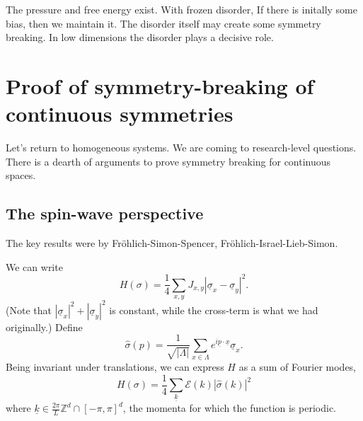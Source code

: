 \documentclass[12pt]{book}
\theoremstyle{norm}
\begin{document}
The pressure and free energy exist. With frozen disorder, 
If there is initally some bias, then we maintain it. The disorder itself may create some symmetry breaking. In low dimensions the disorder plays a decisive role.

\section{Proof of symmetry-breaking of continuous symmetries
}

Let's return to homogeneous systems. We are coming to research-level questions. There is a dearth of arguments to prove symmetry breaking for continuous spaces. 

\subsection{The spin-wave perspective}

The key results were by Fr\"ohlich-Simon-Spencer, Fr\"ohlich-Israel-Lieb-Simon.

We can write 
\begin{equation}\label{eq:csb-h1}
H(\sigma) = \frac{1}{4} \sum_{x,y} J_{x,y} |\underline{\sigma}_x - \underline{\sigma}_y|^2.
\end{equation}%
(Note that $|\underline{\sigma}_x|^2 + |\underline{\sigma}_y|^2$ is constant, while the cross-term is what we had originally.)
Define
\begin{equation}\label{eq:csb-f}
\widehat{\sigma} (p) = \frac{1}{\sqrt{|\Lambda|}} \sum_{x\in \Lambda} e^{i\underline{p} \cdot \underline{x}} \underline{\sigma}_x.
\end{equation}
Being invariant under translations, we can express $H$ as a sum of Fourier modes,
\begin{equation}\label{eq:csb-h}
H(\sigma) = \frac{1}{4}\sum_{\underline{k}} \mathcal{E}(k) |\widehat{\sigma}(k)|^2
\end{equation}
where $\underline{k} \in \frac{2\pi}{L}\mathbb{Z}^d \cap [-\pi, \pi]^d$,
the momenta for which the function is periodic.
\end{document}
